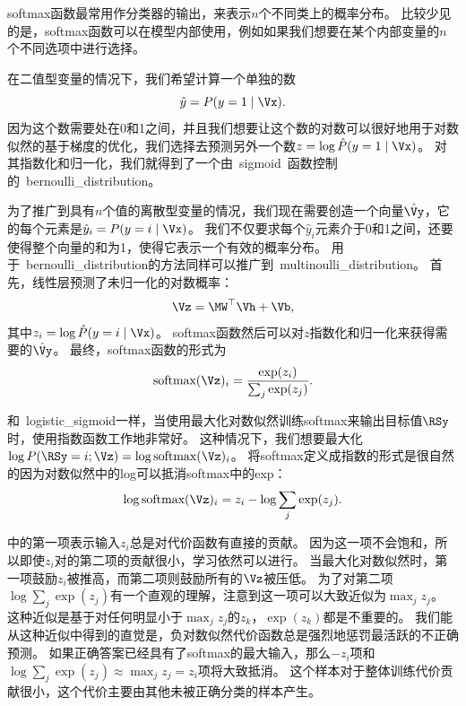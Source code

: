 
softmax函数最常用作分类器的输出，来表示$n$个不同类上的概率分布。
比较少见的是，softmax函数可以在模型内部使用，例如如果我们想要在某个内部变量的$n$个不同选项中进行选择。

在二值型变量的情况下，我们希望计算一个单独的数
\begin{equation}
\hat{y} = P(y=1\mid\Vx).
\end{equation}
因为这个数需要处在0和1之间，并且我们想要让这个数的对数可以很好地用于对数似然的基于梯度的优化，我们选择去预测另外一个数$z=\log \hat{P}(y=1\mid\Vx)$。
对其指数化和归一化，我们就得到了一个由~\gls{sigmoid}~函数控制的~\gls{bernoulli_distribution}。

为了推广到具有$n$个值的离散型变量的情况，我们现在需要创造一个向量$\hat{\Vy}$，它的每个元素是$\hat{y}_i = P(y=i\mid\Vx)$。
我们不仅要求每个$\hat{y}_i$元素介于0和1之间，还要使得整个向量的和为1，使得它表示一个有效的概率分布。
用于~\gls{bernoulli_distribution}的方法同样可以推广到~\gls{multinoulli_distribution}。
首先，线性层预测了未归一化的对数概率：
\begin{equation}
\Vz = \MW^\top \Vh+\Vb,
\end{equation}
其中$z_i=\log \hat{P}(y=i\mid\Vx)$。
softmax函数然后可以对$z$指数化和归一化来获得需要的$\hat{\Vy}$。
最终，softmax函数的形式为
\begin{equation}
\text{softmax}(\Vz)_i = \frac{\exp(z_i)}{\sum_j \exp(z_j)}.
\end{equation}

和~\gls{logistic_sigmoid}一样，当使用最大化对数似然训练softmax来输出目标值$\RSy$时，使用指数函数工作地非常好。
这种情况下，我们想要最大化$\log P(\RSy =i; \Vz)=\log \text{softmax}(\Vz)_i$。
将softmax定义成指数的形式是很自然的因为对数似然中的log可以抵消softmax中的exp：
\begin{equation}
\log \text{softmax}(\Vz)_i = z_i - \log \sum_j \exp(z_j).
\label{eq:6.30}
\end{equation}


中的第一项表示输入$z_i$总是对代价函数有直接的贡献。
因为这一项不会饱和，所以即使$z_i$对的第二项的贡献很小，学习依然可以进行。
当最大化对数似然时，第一项鼓励$z_i$被推高，而第二项则鼓励所有的$\Vz$被压低。
为了对第二项$\log \sum_j \exp(z_j)$有一个直观的理解，注意到这一项可以大致近似为$\max_j z_j$。
这种近似是基于对任何明显小于$\max_j z_j$的$z_k$，$\exp(z_k)$都是不重要的。
我们能从这种近似中得到的直觉是，负对数似然代价函数总是强烈地惩罚最活跃的不正确预测。
如果正确答案已经具有了softmax的最大输入，那么$-z_i$项和$\log\sum_j \exp(z_j) \approx \max_j z_j = z_i$项将大致抵消。
这个样本对于整体训练代价贡献很小，这个代价主要由其他未被正确分类的样本产生。

